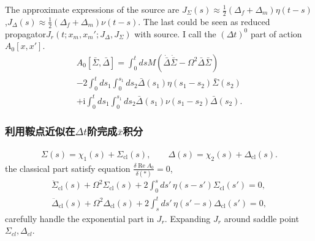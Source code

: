 \documentclass{article}
\begin{document}
The approximate expressions of the source are  $J_{\Sigma}(s)\approx \frac{1}{2}(\Delta_f+\Delta_m)\eta(t-s)$,$J_\Delta(s)\approx\frac{1}{2}(\Delta_f+\Delta_m)\nu(t-s)$.
The last could be seen as reduced propagator$J_r(t;x_m,x_m';J_\Delta,J_\Sigma)$ with source.
I call the $(\Delta t)^0$ part of action $A_0[x,x']$.
\begin{align*}
    A_0[\bar{\Sigma},\bar{\Delta}]=\int_0^t ds M(\dot{\bar{\Delta}}\dot{\bar{\Sigma}}-\Omega^2\bar{\Delta}\bar{\Sigma})\\-2\int_0^{t} ds_1\int_0^{s_1}ds_2\bar{\Delta}(s_1)\eta(s_1-s_2)\bar{\Sigma}(s_2)\\+\mathrm{i}\int_0^{t} ds_1\int_0^{s_1}ds_2\bar{\Delta}(s_1)\nu(s_1-s_2)\bar{\Delta}(s_2).
\end{align*}
\subsubsection{利用鞍点近似在$\Delta t$阶完成$\bar{x}$积分}
\begin{align*}
    \Sigma(s) = \chi_1(s) + \Sigma_{\mathrm{cl}}(s), \qquad \Delta(s) = \chi_2(s) + \Delta_{\mathrm{cl}}(s).
\end{align*}
the classical part satisfy equation $\frac{\delta \operatorname{Re}A_0}{\delta(*)}=0$,
\begin{align}
    \ddot{\Sigma}_{\mathrm{cl}}(s)+ \Omega^2 \Sigma_{\mathrm{cl}}(s)+ 2 \int_0^s ds' \, \eta(s - s') \Sigma_{\mathrm{cl}}(s')= 0,\label{eq:saddle1}\\
    \ddot{\Delta}_{\mathrm{cl}}(s)+ \Omega^2 \Delta_{\mathrm{cl}}(s)+ 2 \int_s^t ds' \, \eta(s' - s) \Delta_{\mathrm{cl}}(s')= 0,\label{eq:saddle2}
\end{align}
carefully handle the exponential part in $J_r$. Expanding $J_r$ around saddle point $\Sigma_{cl},\Delta_{cl}$.
\end{document}
